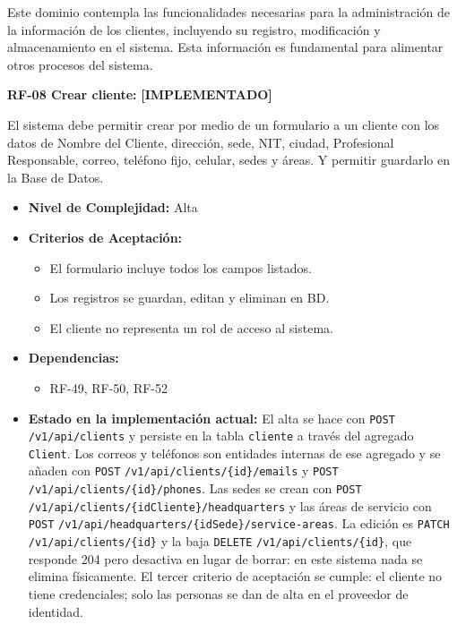 \documentclass[12pt,a4paper]{article}
\newcommand{\ruta}[1]{\nolinkurl{#1}}
\newcommand{\estadoImplementado}{\textcolor{mainRed}{\textbf{[IMPLEMENTADO]}}}
\begin{document}
Este dominio contempla las funcionalidades necesarias para la administración de la información de los clientes, incluyendo su registro, modificación y almacenamiento en el sistema. Esta información es fundamental para alimentar otros procesos del sistema.

\textbf{RF-08 Crear cliente:} \estadoImplementado{}

El sistema debe permitir crear por medio de un formulario a un cliente con los datos de Nombre del Cliente, dirección, sede, NIT, ciudad, Profesional Responsable, correo, teléfono fijo, celular, sedes y áreas. Y permitir guardarlo en la Base de Datos.

\begin{itemize}
  \item \textbf{Nivel de Complejidad:} Alta

  \item \textbf{Criterios de Aceptación:}
  \begin{itemize}
    \item El formulario incluye todos los campos listados.
    \item Los registros se guardan, editan y eliminan en BD.
    \item El cliente no representa un rol de acceso al sistema.
  \end{itemize}

  \item \textbf{Dependencias:}
  \begin{itemize}
    \item RF-49, RF-50, RF-52
  \end{itemize}

  \item \textbf{Estado en la implementación actual:} El alta se hace con \texttt{POST} \ruta{/v1/api/clients} y persiste en la tabla \texttt{cliente} a través del agregado \texttt{Client}. Los correos y teléfonos son entidades internas de ese agregado y se añaden con \texttt{POST} \ruta{/v1/api/clients/{id}/emails} y \texttt{POST} \ruta{/v1/api/clients/{id}/phones}. Las sedes se crean con \texttt{POST} \ruta{/v1/api/clients/{idCliente}/headquarters} y las áreas de servicio con \texttt{POST} \ruta{/v1/api/headquarters/{idSede}/service-areas}. La edición es \texttt{PATCH} \ruta{/v1/api/clients/{id}} y la baja \texttt{DELETE} \ruta{/v1/api/clients/{id}}, que responde 204 pero desactiva en lugar de borrar: en este sistema nada se elimina físicamente. El tercer criterio de aceptación se cumple: el cliente no tiene credenciales; solo las personas se dan de alta en el proveedor de identidad.


\end{itemize}
\end{document}
